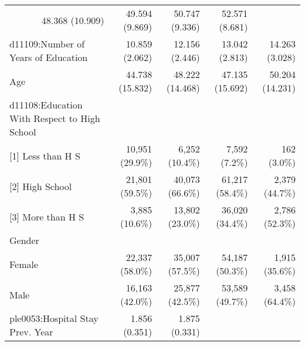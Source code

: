 \documentclass{article}
\begin{document}
\begin{table}[!h]
\begin{tabular}{lllll}
  \multicolumn{1}{r}{48.368 (10.909)} &
  \multicolumn{1}{r}{49.594 (9.869)} &
  \multicolumn{1}{r}{50.747 (9.336)} &
  \multicolumn{1}{r}{52.571 (8.681)} \\
\multicolumn{1}{l}{d11109:Number of Years of Education} &
  \multicolumn{1}{r}{10.859 (2.062)} &
  \multicolumn{1}{r}{12.156 (2.446)} &
  \multicolumn{1}{r}{13.042 (2.813)} &
  \multicolumn{1}{r}{14.263 (3.028)} \\
\multicolumn{1}{l}{Age} &
  \multicolumn{1}{r}{44.738 (15.832)} &
  \multicolumn{1}{r}{48.222 (14.468)} &
  \multicolumn{1}{r}{47.135 (15.692)} &
  \multicolumn{1}{r}{50.204 (14.231)} \\
\multicolumn{1}{l}{d11108:Education With Respect to High School} &
  \multicolumn{1}{r}{} &
  \multicolumn{1}{r}{} &
  \multicolumn{1}{r}{} &
  \multicolumn{1}{r}{} \\
\multicolumn{1}{l}{\hspace{1em}[1] Less than H S} &
  \multicolumn{1}{r}{10,951 (29.9\%)} &
  \multicolumn{1}{r}{6,252 (10.4\%)} &
  \multicolumn{1}{r}{7,592 (7.2\%)} &
  \multicolumn{1}{r}{162 (3.0\%)} \\
\multicolumn{1}{l}{\hspace{1em}[2] High School} &
  \multicolumn{1}{r}{21,801 (59.5\%)} &
  \multicolumn{1}{r}{40,073 (66.6\%)} &
  \multicolumn{1}{r}{61,217 (58.4\%)} &
  \multicolumn{1}{r}{2,379 (44.7\%)} \\
\multicolumn{1}{l}{\hspace{1em}[3] More than H S} &
  \multicolumn{1}{r}{3,885 (10.6\%)} &
  \multicolumn{1}{r}{13,802 (23.0\%)} &
  \multicolumn{1}{r}{36,020 (34.4\%)} &
  \multicolumn{1}{r}{2,786 (52.3\%)} \\
\multicolumn{1}{l}{Gender} &
  \multicolumn{1}{r}{} &
  \multicolumn{1}{r}{} &
  \multicolumn{1}{r}{} &
  \multicolumn{1}{r}{} \\
\multicolumn{1}{l}{\hspace{1em}Female} &
  \multicolumn{1}{r}{22,337 (58.0\%)} &
  \multicolumn{1}{r}{35,007 (57.5\%)} &
  \multicolumn{1}{r}{54,187 (50.3\%)} &
  \multicolumn{1}{r}{1,915 (35.6\%)} \\
\multicolumn{1}{l}{\hspace{1em}Male} &
  \multicolumn{1}{r}{16,163 (42.0\%)} &
  \multicolumn{1}{r}{25,877 (42.5\%)} &
  \multicolumn{1}{r}{53,589 (49.7\%)} &
  \multicolumn{1}{r}{3,458 (64.4\%)} \\
\multicolumn{1}{l}{ple0053:Hospital Stay Prev. Year} &
  \multicolumn{1}{r}{1.856 (0.351)} &
  \multicolumn{1}{r}{1.875 (0.331)} &

\end{tabular}
\end{table}
\end{document}
